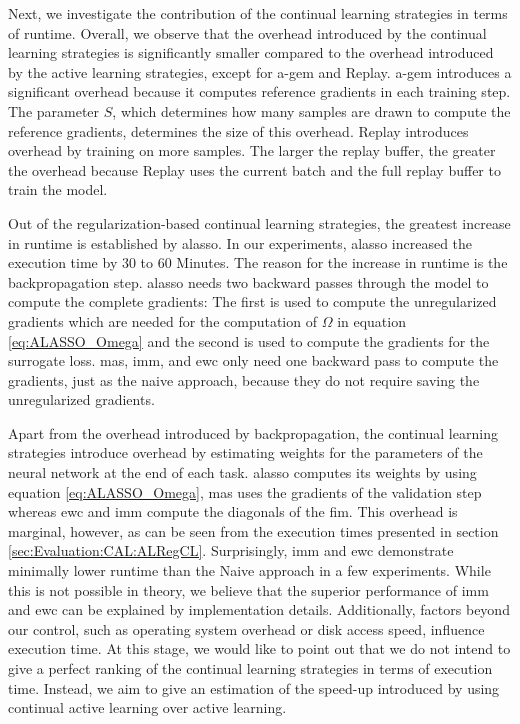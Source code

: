 Next, we investigate the contribution of the continual learning strategies in terms of runtime. Overall, we observe that the overhead introduced by the
continual learning strategies is significantly smaller compared to the overhead introduced by the active learning strategies, except for \gls{a-gem}
and Replay. \gls{a-gem} introduces a significant overhead because it computes reference gradients in each training step. The parameter $S$, which determines
how many samples are drawn to compute the reference gradients, determines the size of this overhead. Replay introduces overhead by training
on more samples. The larger the replay buffer, the greater the overhead because Replay uses the current batch and the full replay buffer to train the model.

Out of the regularization-based continual learning strategies, the greatest increase in runtime is established by \gls{alasso}. In our experiments,
\gls{alasso} increased the execution time by 30 to 60 Minutes. The reason for the increase in runtime is the backpropagation step. \gls{alasso} needs
two backward passes through the model to compute the complete gradients: The first is used to compute the unregularized gradients which are needed for
the computation of $\Omega$ in equation \ref{eq:ALASSO_Omega} and the second is used to compute the gradients for the surrogate loss. \gls{mas},
\gls{imm}, and \gls{ewc} only need one backward pass to compute the gradients, just as the naive approach, because they do not require saving the
unregularized gradients. \par
Apart from the overhead introduced by backpropagation, the continual learning strategies introduce overhead by estimating weights for the parameters of
the neural network at the end of each task. \gls{alasso} computes its weights by using equation \ref{eq:ALASSO_Omega}, \gls{mas} uses the gradients of
the validation step whereas \gls{ewc} and \gls{imm} compute the diagonals of the \gls{fim}. This overhead is marginal, however, as can be seen from the
execution times presented in section \ref{sec:Evaluation:CAL:ALRegCL}. Surprisingly, \gls{imm} and \gls{ewc} demonstrate minimally lower runtime
than the Naive approach in a few experiments. While this is not possible in theory, we believe that the superior performance of \gls{imm} and \gls{ewc}
can be explained by implementation details. Additionally, factors beyond our control, such as operating system overhead or disk access speed, influence execution time.
At this stage, we would like to point out that we do not intend to give a perfect ranking of the continual learning strategies in terms of execution time.
Instead, we aim to give an estimation of the speed-up introduced by using continual active learning over active learning. \par



